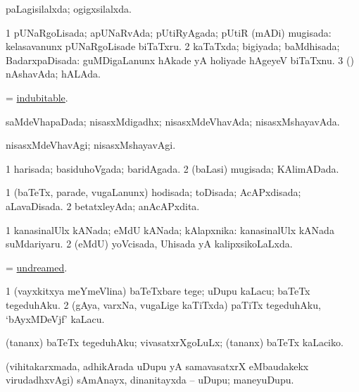 \bentry
{} 
\gl{\gu}
\expl{}
\bmng
 paLagisilalxda; ogigxsilalxda. 
\emng
\eentry

\bentry
{} 
\gl{\gu}
\bmng
\bnum
\num{1} pUNaRgoLisada; apUNaRvAda; pUtiRyAgada; pUtiR (mADi) mugisada:  kelasavanunx pUNaRgoLisade biTaTxru. 
\num{2} kaTaTxda; bigiyada; baMdhisada; BadarxpaDisada:  guMDigaLanunx hAkade yA holiyade hAgeyeV biTaTxnu. 
\num{3} (\pArxparx) nAshavAda; hALAda. 
\enum
\emng
\eentry

\bentry
{} 
\gl{\gu}
\expl{}
\bmng
 = \hyperref{kandict_i.pdf}{I}{indubitable}{indubitable}. 
\emng
\eentry

\bentry
{} 
\gl{\gu}
\expl{}
\bmng
 saMdeVhapaDada; nisasxMdigadhx; nisasxMdeVhavAda; nisasxMshayavAda. 
\emng
\eentry

\bentry
{} 
\gl{\kirxvi}
\expl{}
\bmng
 nisasxMdeVhavAgi; nisasxMshayavAgi. 
\emng
\eentry

\bentry
{} 
\gl{\gu}
\expl{}
\bmng
\bnum
\num{1} harisada; basiduhoVgada; baridAgada. 
\num{2} (baLasi) mugisada; KAlimADada. 
\enum
\emng
\eentry

\bentry
{} 
\gl{\gu}
\expl{}
\bmng
\bnum
\num{1} (baTeTx, parade, \mo vugaLanunx) hodisada; toDisada; AcAPxdisada; aLavaDisada. 
\num{2} betatxleyAda; anAcAPxdita. 
\enum
\emng
\eentry

\bentry
{} 
\gl{\gu}
\expl{}
\bmng
\bnum
\num{1} kanasinalUlx kANada; eMdU kANada; kAlapxnika:  kanasinalUlx kANada suMdariyaru. 
\num{2} (eMdU) yoVcisada, Uhisada yA kalipxsikoLaLxda. 
\enum
\emng
\eentry

\bentry
{} 
\gl{\gu}
\expl{}
\bmng
 = \hyperlink{undreamed}{undreamed}. 
\emng
\eentry

\bentry
{} 
\gl{\sakirx}
\expl{}
\bmng
\bnum
\num{1} (vayxkitxya meYmeVlina) baTeTxbare tege; uDupu kaLacu; baTeTx tegeduhAku. 
\num{2} (gAya, varxNa, \mo vugaLige kaTiTxda) paTiTx tegeduhAku, `bAyxMDeVjf' kaLacu. 
\enum
\emng

\noindent
\gl{\akirx}
\expl{}
\bmng
(tananx) baTeTx tegeduhAku; vivasatxrXgoLuLx; (tananx) baTeTx kaLaciko. 
\emng
\eentry

\bentry
{} 
\gl{\nA}
\expl{}
\bmng
 (vihitakarxmada, adhikArada uDupu yA samavasatxrX eMbaudakekx virudadhxvAgi) sAmAnayx, dinanitayxda -- uDupu; maneyuDupu. 
\emng
\eentry

